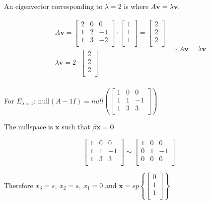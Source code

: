 \documentclass[
]{article}
\begin{document}
An eigenvector corresponding to $\lambda = 2$ is where
$A\mathbf{v} = \lambda\mathbf{v}$.

$$\begin{matrix}
A\mathbf{v} = \begin{bmatrix}
2 & 0 & 0 \\
1 & 2 & - 1 \\
1 & 3 & - 2 \\
\end{bmatrix} \cdot \begin{bmatrix}
1 \\
1 \\
1 \\
\end{bmatrix} = \begin{bmatrix}
2 \\
2 \\
2 \\
\end{bmatrix} \\
\lambda\mathbf{v} = 2 \cdot \begin{bmatrix}
2 \\
2 \\
2 \\
\end{bmatrix} \\
\end{matrix} \Rightarrow A\mathbf{v} = \lambda\mathbf{v}$$

For $E_{\lambda = 1}$:
$\text{null}(A - 1I) = null\left( \begin{bmatrix}
1 & 0 & 0 \\
1 & 1 & - 1 \\
1 & 3 & 3 \\
\end{bmatrix} \right)$

The nullspace is $\mathbf{x}$ such that
$\beta\mathbf{x} = \mathbf{0}$

$$\begin{bmatrix}
1 & 0 & 0 \\
1 & 1 & - 1 \\
1 & 3 & 3 \\
\end{bmatrix}\sim\begin{bmatrix}
1 & 0 & 0 \\
0 & 1 & - 1 \\
0 & 0 & 0 \\
\end{bmatrix}$$

Therefore $x_{3} = s,\ x_{2} = s,\ x_{1} = 0$ and
$\mathbf{x} = sp\left\{ \begin{bmatrix}
0 \\
1 \\
1 \\
\end{bmatrix} \right\}$
\end{document}
